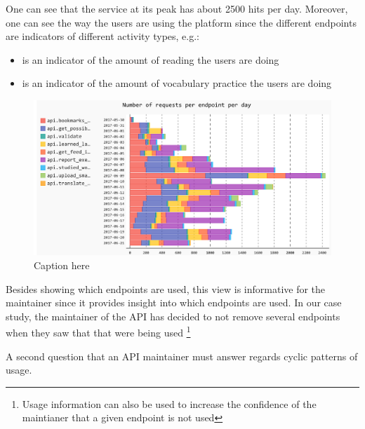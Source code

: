 \documentclass[conference]{IEEEtran}
\begin{document}
  One can see that the service at its peak has about 2500 hits per day. Moreover, one can see the way the users are using the platform since the different endpoints are indicators of different activity types, e.g.: 

  \begin{itemize}

    \item {\color{myblue}\epTranslations} is an indicator of the amount of reading the users are doing

    \item {\color{myviolet} \epOutcome} is an indicator of the amount of vocabulary practice the users are doing

  \end{itemize}




  \begin{figure}[h!]
    \centering
    \includegraphics[width=\linewidth]{all_endpoints_usage.png}
    \caption{Caption here}
    \label{fig:aeu}
  \end{figure}

  Besides showing which endpoints are used, this view is informative for the maintainer since it provides insight into which endpoints are used. In our case study, the maintainer of the API has decided to not remove several endpoints when they saw that that were being used \footnote{Usage information can also be used to increase the confidence of the maintianer that a given endpoint is not used}

  \niceseparator

  A second question that an API maintainer must answer regards cyclic patterns of usage. 


\end{document}
